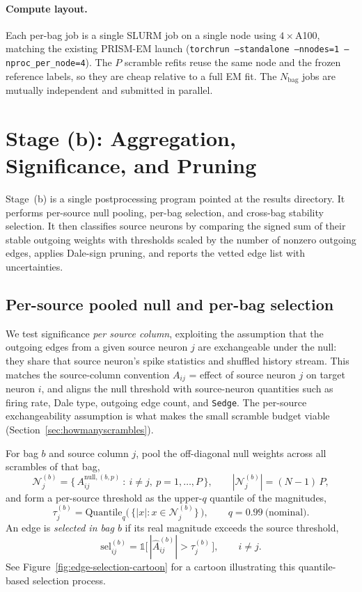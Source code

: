 \documentclass[11pt]{article}
\begin{document}
\paragraph{Compute layout.} Each per-bag job is a single SLURM job on a
single node using \(4\times\)A100, matching the existing PRISM-EM launch
(\texttt{torchrun --standalone --nnodes=1 --nproc\_per\_node=4}). The
\(P\) scramble refits reuse the same node and the frozen reference labels,
so they are cheap relative to a full EM fit. The \(N_{\text{bag}}\) jobs are
mutually independent and submitted in parallel.

\section{Stage (b): Aggregation, Significance, and Pruning}
\label{sec:aggregate}

Stage~(b) is a single postprocessing program pointed at the results
directory. It performs per-source null pooling, per-bag selection, and
cross-bag stability selection. It then classifies source neurons by comparing
the signed sum of their stable outgoing weights with thresholds scaled by the
number of nonzero outgoing edges, applies Dale-sign pruning, and reports the
vetted edge list with uncertainties.

\subsection{Per-source pooled null and per-bag selection}
\label{sec:persource}

We test significance \emph{per source column}, exploiting the assumption that
the outgoing edges from a given source neuron \(j\) are exchangeable under
the null: they share that source neuron's spike statistics and shuffled
history stream. This matches the source-column convention
\(A_{ij}\) = effect of source neuron \(j\) on target neuron \(i\), and aligns
the null threshold with source-neuron quantities such as firing rate, Dale
type, outgoing edge count, and \texttt{Sedge}. The per-source exchangeability
assumption is what makes the small scramble budget viable
(Section~\ref{sec:howmanyscrambles}).

For bag \(b\) and source column \(j\), pool the off-diagonal null weights across all
scrambles of that bag,
\[
\mathcal{N}^{(b)}_j
=\big\{\,A^{\text{null},(b,p)}_{ij}\ :\ i\neq j,\ p=1,\dots,P\,\big\},
\qquad |\mathcal{N}^{(b)}_j| = (N-1)\,P,
\]
and form a per-source threshold as the upper-\(q\) quantile of the magnitudes,
\[
\tau^{(b)}_j = \mathrm{Quantile}_{q}\!\big(\,\{|x| : x\in\mathcal{N}^{(b)}_j\}\,\big),
\qquad q = 0.99 \ \text{(nominal)}.
\]
An edge is \emph{selected in bag \(b\)} if its real magnitude exceeds the
source threshold,
\[
\text{sel}^{(b)}_{ij} = \mathbb{1}\!\big[\,|\hat A^{(b)}_{ij}| > \tau^{(b)}_j\,\big],
\qquad i\neq j.
\]
See Figure~\ref{fig:edge-selection-cartoon} for a cartoon illustrating this quantile-based selection process.
\end{document}
